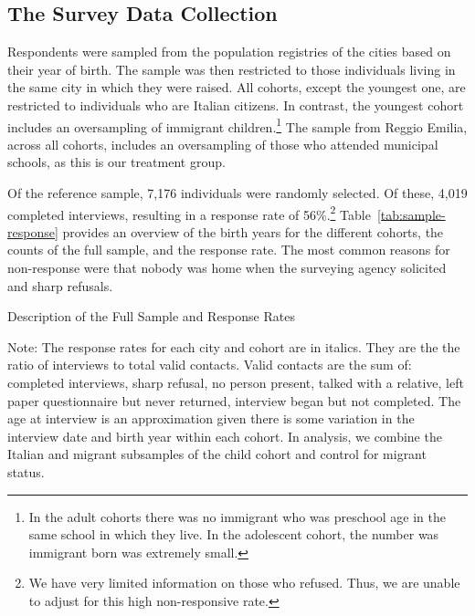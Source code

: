 \subsection{The Survey Data Collection}

Respondents were sampled from the population registries of the cities based on their year of birth. The sample was then restricted to those individuals living in the same city in which they were raised. All cohorts, except the youngest one, are restricted to individuals who are Italian citizens. In contrast, the youngest cohort includes an oversampling of immigrant children.\footnote{In the adult cohorts there was no immigrant who was preschool age in the same school in which they live. In the adolescent cohort, the number was immigrant born was extremely small.} The sample from Reggio Emilia, across all cohorts, includes an oversampling of those who attended municipal schools, as this is our treatment group.

Of the reference sample, 7,176 individuals were randomly selected. Of these, 4,019 completed interviews, resulting in a response rate of 56\%.\footnote{We have very limited information on those who refused. Thus, we are unable to adjust for this high non-responsive rate.} Table~\ref{tab:sample-response} provides an overview of the birth years for the different cohorts, the counts of the full sample, and the response rate. The most common reasons for non-response were that nobody was home when the surveying agency solicited and sharp refusals.

\begin{table}[H]
\centering
\begin{threeparttable}
	\caption{Description of the Full Sample and Response Rates}\label{tab:sample-response}
	
\begin{tablenotes}
\footnotesize
Note: The response rates for each city and cohort are in italics. They are the the ratio of interviews to total valid contacts. Valid contacts are the sum of: completed interviews, sharp refusal, no person present, talked with a relative, left paper questionnaire but never returned, interview began but not completed. The age at interview is an approximation given there is some variation in the interview date and birth year within each cohort. In analysis, we combine the Italian and migrant subsamples of the child cohort and control for migrant status.
\end{tablenotes}
\end{threeparttable}
\end{table}

